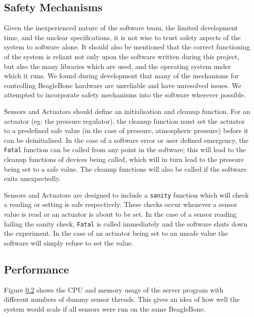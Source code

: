 \subsection{Safety Mechanisms}

Given the inexperienced nature of the software team, the limited development time, and the unclear specifications, it is not wise to trust safety aspects of the system to software alone. It should also be mentioned that the correct functioning of the system is reliant not only upon the software written during this project, but also the many libraries which are used, and the operating system under which it runs. We found during development that many of the mechanisms for controlling BeagleBone hardware are unreliable and have unresolved issues. We attempted to incorporate safety mechanisms into the software wherever possible.

Sensors and Actuators should define an initialisation and cleanup function. For an actuator (eg: the pressure regulator), the cleanup function must set the actuator to a predefined safe value (in the case of pressure, atmospheric pressure) before it can be deinitialised. In the case of a software error or user defined emergency, the \verb/Fatal/ function can be called from any point in the software; this will lead to the cleanup functions of devices being called, which will in turn lead to the pressure being set to a safe value. The cleanup functions will also be called if the software exits unexpectedly.

Sensors and Actuators are designed to include a \verb/sanity/ function which will check a reading or setting is safe respectively. These checks occur whenever a sensor value is read or an actuator is about to be set. In the case of a sensor reading failing the sanity check, \verb/Fatal/ is called immediately and the software shuts down the experiment. In the case of an actuator being set to an unsafe value the software will simply refuse to set the value.


\subsection{Performance}

Figure \ref{} shows the CPU and memory usage of the server program with different numbers of dummy sensor threads. This gives an idea of how well the system would scale if all sensors were run on the same BeagleBone.

